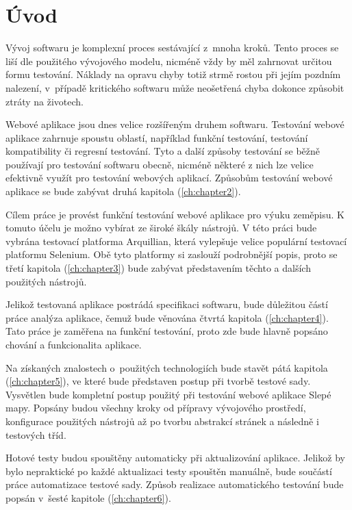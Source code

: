 \documentclass[
    color,   %
	table,   %
    twoside, %
    nolot, nolof
]{fithesis3}
\begin{document}
\raggedbottom

\chapter{Úvod}
\label{ch:chapter1}
Vývoj softwaru je komplexní proces sestávající z~mnoha kroků. Tento proces se liší dle použitého vývojového modelu, nicméně vždy by měl zahrnovat určitou formu testování. Náklady na opravu chyby totiž strmě rostou při jejím pozdním nalezení, v~případě kritického softwaru může neošetřená chyba dokonce způsobit ztráty na životech.

Webové aplikace jsou dnes velice rozšířeným druhem softwaru. Testování webové aplikace zahrnuje spoustu oblastí, například funkční testování, testování kompatibility či regresní testování. Tyto a další způsoby testování se běžně používají pro testování softwaru obecně, nicméně některé z nich lze velice efektivně využít pro testování webových aplikací. Způsobům testování webové aplikace se bude zabývat druhá kapitola (\ref{ch:chapter2}).

Cílem práce je provést funkční testování webové aplikace pro výuku zeměpisu. K tomuto účelu je možno vybírat ze široké škály nástrojů. V této práci bude vybrána testovací platforma Arquillian, která vylepšuje velice populární testovací platformu Selenium. Obě tyto platformy si zaslouží podrobnější popis, proto se třetí kapitola (\ref{ch:chapter3}) bude zabývat představením těchto a dalších použitých nástrojů.

Jelikož testovaná aplikace postrádá specifikaci softwaru, bude důležitou částí práce analýza aplikace, čemuž bude věnována čtvrtá kapitola (\ref{ch:chapter4}). Tato práce je zaměřena na funkční testování, proto zde bude hlavně popsáno chování a funkcionalita aplikace. 

Na získaných znalostech o~použitých technologiích bude stavět pátá kapitola (\ref{ch:chapter5}), ve které bude představen postup při tvorbě testové sady. Vysvětlen bude kompletní postup použitý při testování webové aplikace Slepé mapy. Popsány budou všechny kroky od přípravy vývojového prostředí, konfigurace použitých nástrojů až po tvorbu abstrakcí stránek a následně i testových tříd.

Hotové testy budou spouštěny automaticky při aktualizování aplikace. Jelikož by bylo  nepraktické po každé aktualizaci testy spouštěn manuálně, bude součástí práce automatizace testové sady. Způsob realizace automatického testování bude popsán v~šesté kapitole (\ref{ch:chapter6}).
\end{document}
